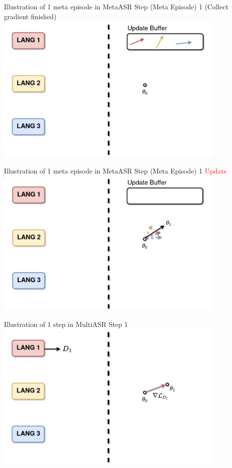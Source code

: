 \documentclass{beamer}
\begin{document}
\begin{frame}[t]{Illustration of 1 meta episode in MetaASR}
  Step (Meta Episode) 1 (Collect gradient finished)
  \center \includegraphics[width=0.85\textwidth]{fig/meta_before_update.png}
\end{frame}

\begin{frame}[t]{Illustration of 1 meta episode in MetaASR}
  Step (Meta Episode) 1 \textcolor{red}{Update}
  \center \includegraphics[width=0.85\textwidth]{fig/meta_update.png}
\end{frame}


\begin{frame}[t]{Illustration of 1 step in MultiASR}
  Step 1 
  \center \includegraphics[width=0.85\textwidth]{fig/multi_step1.png}
\end{frame}
\end{document}
